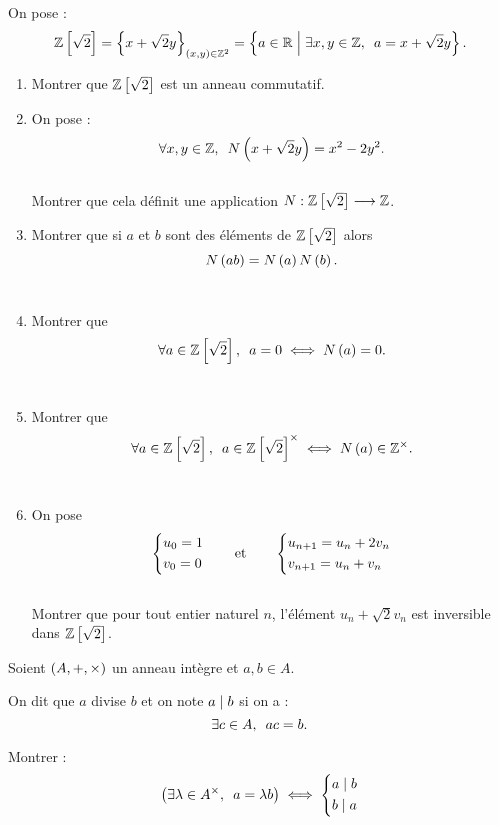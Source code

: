 \begin{exo}
On pose : \[\Z\croch{\sqrt{2}}=\accol{x+\sqrt{2}y}_{\paren{x,y}\in\Z^2}=\accol{a\in\R\tq\quantifs{\exists x,y\in\Z}a=x+\sqrt{2}y}.\]

\begin{enumerate}
\item Montrer que \(\mathbb{Z}\left[\sqrt{2}\right]\) est un anneau commutatif. \\

\item On pose : \[\quantifs{\forall x,y\in\Z}N\paren{x+\sqrt{2}y}=x^2-2y^2.\] \\

Montrer que cela définit une application \(N:\mathbb{Z}\left[\sqrt{2}\right]\longrightarrow\mathbb{Z}\). \\

\item Montrer que si \(a\) et \(b\) sont des éléments de \(\mathbb{Z}\left[\sqrt{2}\right]\) alors \[N\left(ab\right)=N\left(a\right)N\left(b\right).\] \\

\item Montrer que \[\quantifs{\forall a\in\Z\croch{\sqrt{2}}}a=0\ssi N\paren{a}=0.\] \\

\item Montrer que \[\quantifs{\forall a\in\Z\croch{\sqrt{2}}}a\in\Z\croch{\sqrt{2}}\croix\ssi N\paren{a}\in\Z\croix.\] \\

\item On pose \[\begin{dcases}u_0=1 \\ v_0=0\end{dcases}\qquad\text{et}\qquad\begin{dcases}u_{n+1}=u_n+2v_n \\ v_{n+1}=u_n+v_n\end{dcases}\] \\

Montrer que pour tout entier naturel \(n\), l'élément \(u_n+\sqrt{2}v_n\) est inversible dans \(\mathbb{Z}\left[\sqrt{2}\right]\).
\end{enumerate}
\end{exo}

\begin{corr}
\end{corr}

\begin{exo}
Soient \(\anneau{A}\) un anneau intègre et \(a,b\in A\).

On dit que \(a\) divise \(b\) et on note \(a\mid b\) si on a : \[\quantifs{\exists c\in A}ac=b.\]

Montrer : \[\paren{\quantifs{\exists\lambda\in A\croix}a=\lambda b}\ssi\begin{dcases}a\divise b \\ b\divise a\end{dcases}\]
\end{exo}

